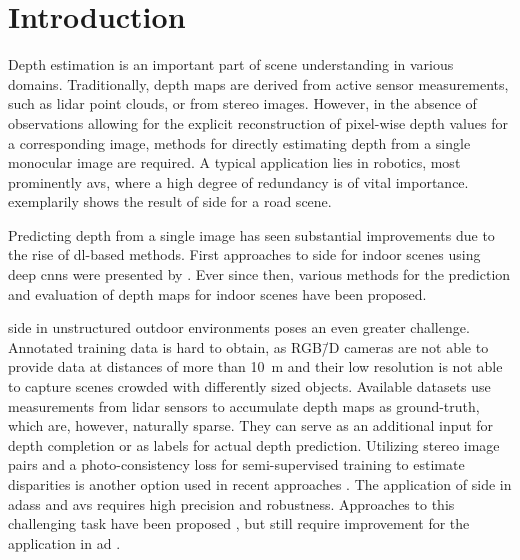 \documentclass[lang=english]{tumarxivarticle}
\newcommand{\citep}{\parencite}
\newcommand{\citet}{\textcite}
\begin{document}
\glsresetall
{}

\flushbottom %


\section{Introduction}

Depth estimation is an important part of scene understanding in various domains.
Traditionally, depth maps are derived from active sensor measurements, such as \gls{lidar} point clouds, or from stereo images.
However, in the absence of observations allowing for the explicit reconstruction of pixel-wise depth values for a corresponding image, methods for directly estimating depth from a single monocular image are required.
A typical application lies in robotics, most prominently \glspl{av}, where a high degree of redundancy is of vital importance.
 exemplarily shows the result of \gls{side} for a road scene.

Predicting depth from a single image has seen substantial improvements due to the rise of \gls{dl}-based methods.
First approaches to \gls{side} for indoor scenes using deep \glspl{cnn} were presented by \citet{Eigen14,Eigen15}.
Ever since then, various methods for the prediction \citep{Laina16,Liu15,Li17,Liu18,Heo18,Zioulis18} and evaluation \citep{Koch18} of depth maps for indoor scenes have been proposed.

\Gls{side} in unstructured outdoor environments poses an even greater challenge.
Annotated training data is hard to obtain, as RGB\=/D cameras are not able to provide data at distances of more than \SI{10}{\meter} and their low resolution is not able to capture scenes crowded with differently sized objects.
Available datasets \citep{Geiger13,Cordts16,Huang18} use measurements from \gls{lidar} sensors to accumulate depth maps as ground-truth, which are, however, naturally sparse.
They can serve as an additional input for depth completion \citep{Cheng18} or as labels for actual depth prediction.
Utilizing stereo image pairs and a photo-consistency loss for semi-supervised training to estimate disparities is another option used in recent approaches \citep{Godard17,Yang18,Kuznietsov17}.
The application of \gls{side} in \glspl{adas} and \glspl{av} requires high precision and robustness.
Approaches to this challenging task have been proposed \citep{Gan18,Kendall18,Smolyanskiy18,Fu18,Guo18b,Li18b,Kong19,Li18c,Zhang18b}, but still require improvement for the application in \gls{ad} \citep{Smolyanskiy18}.
\end{document}

